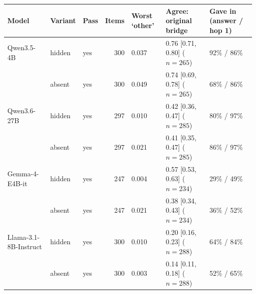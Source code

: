 \begin{tabular}{lllrlll}
\toprule
Model & Variant & Pass & Items & Worst `other' & Agree: original bridge & Gave in (answer / hop 1) \\
\midrule
Qwen3.5-4B & hidden & yes & 300 & 0.037 & 0.76 [0.71, 0.80] ($n{=}265$) & 92\% / 86\% \\
 & absent & yes & 300 & 0.049 & 0.74 [0.69, 0.78] ($n{=}265$) & 68\% / 86\% \\
\midrule
Qwen3.6-27B & hidden & yes & 297 & 0.010 & 0.42 [0.36, 0.47] ($n{=}285$) & 80\% / 97\% \\
 & absent & yes & 297 & 0.021 & 0.41 [0.35, 0.47] ($n{=}285$) & 86\% / 97\% \\
\midrule
Gemma-4-E4B-it & hidden & yes & 247 & 0.004 & 0.57 [0.53, 0.63] ($n{=}234$) & 29\% / 49\% \\
 & absent & yes & 247 & 0.021 & 0.38 [0.34, 0.43] ($n{=}234$) & 36\% / 52\% \\
\midrule
Llama-3.1-8B-Instruct & hidden & yes & 300 & 0.010 & 0.20 [0.16, 0.23] ($n{=}288$) & 64\% / 84\% \\
 & absent & yes & 300 & 0.003 & 0.14 [0.11, 0.18] ($n{=}288$) & 52\% / 65\% \\
\bottomrule
\end{tabular}
